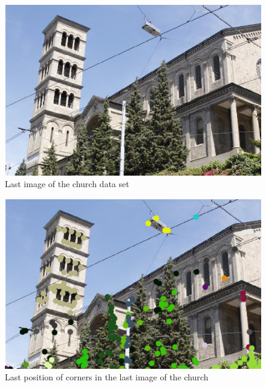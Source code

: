\begin{figure}[h!]
\centering
\includegraphics[width=1 \textwidth]{./Diagrams/last_frame_church.png}
\caption{Last image of the church data set}
\label{fig:last_frame_church}
\end{figure}

\begin{figure}[h!]
\centering
\includegraphics[width=1\textwidth]{./Diagrams/last_frame_church_points.png}
\caption{Last position of corners in the last image of the church}
\label{fig:last_frame_church_points}
\end{figure}

